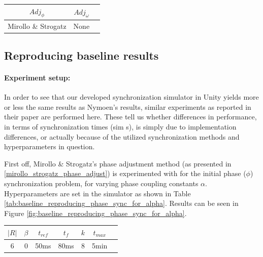 \begin{center}
\begin{tabular}{ |c|c|c| } 
\hline
$Adj_\phi$ & $Adj_\omega$ \\
\hline
Mirollo \& Strogatz & None  \\
\hline
\end{tabular}
\label{tab:phase_sync}
\end{center}

	
	
	
	\subsection{Reproducing baseline results}
	
		\paragraph{Experiment setup:\nl}
		
		In order to see that our developed synchronization simulator in Unity yields more or less the same results as Nymoen's results, similar experiments as reported in their paper are performed here. These tell us whether differences in performance, in terms of synchronization times (sim s), is simply due to implementation differences, or actually because of the utilized synchronization methods and hyperparameters in question. 
		
		First off, Mirollo \& Strogatz's phase adjustment method (as presented in \ref{mirollo_strogatz_phase_adjust}) is experimented with for the initial phase ($\phi$) synchronization problem, for varying phase coupling constants $\alpha$. Hyperparameters are set in the simulator as shown in Table \ref{tab:baseline_reproducing_phase_sync_for_alpha}. Results can be seen in Figure \ref{fig:baseline_reproducing_phase_sync_for_alpha}.
		
		\begin{center}
		\begin{tabular}{ |c|c|c|c|c|c|c| } 
		\hline
		$|R|$ & $\beta$ & $t_{ref}$ & $t_f$ & $k$ & $t_{max}$ \\
		\hline
		6 & 0 & 50ms & 80ms & 8 & 5min \\
		\hline
		\end{tabular}
		\label{tab:baseline_reproducing_phase_sync_for_alpha}
		\end{center}
		
